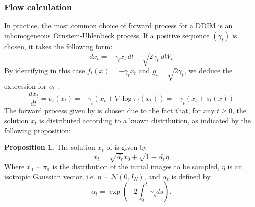 \documentclass[a4paper,10pt]{article}
\theoremstyle{definition} %
\theoremstyle{definition} %
\newtheorem{proposition}[definition]{Proposition}
\theoremstyle{definition} %
\theoremstyle{definition} %
\newcommand{\0}{\boldsymbol{0}}
\begin{document}
\subsubsection{Flow calculation}\label{sec:calcul_numerique}
In practice, the most common choice of forward process for a DDIM is an inhomogeneous Ornstein-Uhlenbeck process. If a positive sequence $(\gamma_t)$  is chosen, it takes the following form:
\begin{equation}\label{eq:OU}
    dx_t = -\gamma_tx_t \,dt + \sqrt{2\gamma_t}\,dW_t
\end{equation}
By identifying in this case $f_t(x) = -\gamma_tx_t$ and $g_t = \sqrt{2\gamma_t}$, we deduce the expression for $v_t$ :
\begin{equation}\label{eq:backward}
    \frac{dx_t}{dt} = v_t(x_t) = -\gamma_t(x_t+\nabla \log \pi_t(x_t)) = -\gamma_t(x_t+s_t(x))
\end{equation}
The forward process given by  is chosen due to the fact that, for any $t \geq 0$, the solution $x_t$ is distributed according to a known distribution, as indicated by the following proposition:
\begin{proposition}\label{prop:solution_processus_direct}
    The solution $x_t$ of  is given by
    \begin{equation}\label{eq:solforphi}
        x_t = \sqrt{\bar{\alpha_t}}x_0 + \sqrt{1-\bar{\alpha_t}}\eta
    \end{equation}
    Where $x_0 \sim \pi_0$ is the distribution of the initial images to be sampled, $\eta$ is an isotropic Gaussian vector, i.e. $\eta \sim \mathcal{N}(0, I_N)$, and $\bar{\alpha_t}$ is defined by 
    \[\bar{\alpha_t} = \exp{\left(-2\int_0^t \gamma_s ds\right)}.\]    
\end{proposition}
\end{document}
